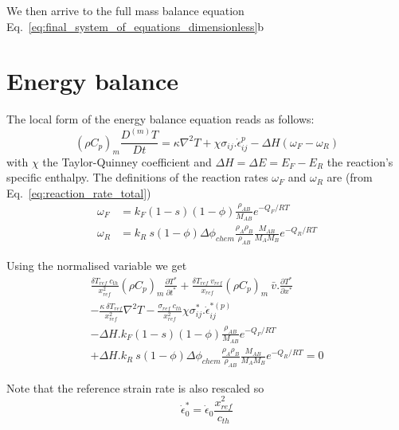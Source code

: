 \documentclass[]{scrreprt}
\begin{document}
We then arrive to the full mass balance equation Eq.~\ref{eq:final_system_of_equations_dimensionless}b

\section{Energy balance}
\label{sec:energy_balance}
The local form of the energy balance equation reads as follows:
\begin{equation}
  \label{eq:energy_balance}
  (\rho C_p)_m \frac{D^{(m)}T}{Dt} = \kappa \nabla^2 T + \chi \sigma_{ij}.\dot{\epsilon}^{p}_{ij} - \Delta H (\omega_F - \omega_R)
\end{equation}
with $\chi$ the Taylor-Quinney coefficient and $\Delta H=\Delta E=E_F-E_R$ the reaction's specific enthalpy.
The definitions of the reaction rates $\omega_F$ and $\omega_R$ are (from Eq.~\ref{eq:reaction_rate_total})
\begin{subequations}
 \label{eq:reaction_rates}
 \begin{align}
 \omega_F &= k_F (1 - s)(1 - \phi)\frac{\rho_{AB}}{M_{AB}}  e^{-Q_F/RT} \\
 \omega_R &= k_R \:s  (1 - \phi)  \Delta \phi_{chem} \frac{\rho_{A} \rho_{B}}{\rho_{AB}} \frac{M_{AB}}{M_A M_B}  e^{-Q_R/RT}
  \end{align}
\end{subequations}

Using the normalised variable we get
\begin{multline}
  \label{eq:energy_balance1}
  \frac{\delta T_{ref}\:c_{th}}{x^2_{ref}}(\rho C_p)_m \frac{\partial T^*}{\partial t^*} + \frac{\delta T_{ref}\:v_{ref}}{x_{ref}}(\rho C_p)_m \:\bar{v}.\frac{\partial T^*}{\partial x^*} \\ 
  - \frac{\kappa\:\delta T_{ref}}{x^2_{ref}} \nabla^2 T - \frac{\sigma_{ref}\:c_{th}}{x^2_{ref}} \chi \sigma^*_{ij}.\dot{\epsilon}^{*(p)}_{ij} \\
  - \Delta H.k_F (1 - s)(1 - \phi)\frac{\rho_{AB}}{M_{AB}}  e^{-Q_F/RT} \\
  + \Delta H. k_R \:s  (1 - \phi)  \Delta \phi_{chem} \frac{\rho_{A} \rho_{B}}{\rho_{AB}} \frac{M_{AB}}{M_A M_B}  e^{-Q_R/RT} = 0
\end{multline}

Note that the reference strain rate is also rescaled so 
\begin{equation}
  \dot{\epsilon}^*_0 = \dot{\epsilon}_0 \frac{x^2_{ref}}{c_{th}}
\end{equation}
\end{document}
